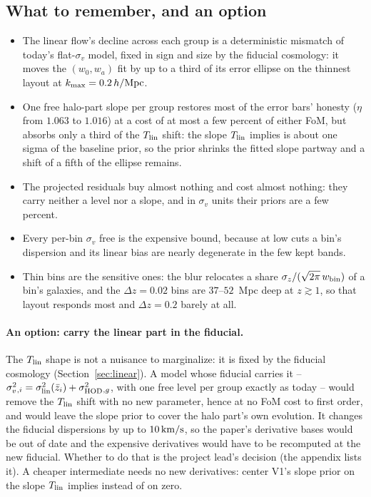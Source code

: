 \documentclass[11pt]{article}
\newcommand{\sv}{\sigma_v}
\newcommand{\slin}{\sigma_{\rm lin}}
\newcommand{\shod}{\sigma_{\rm HOD}}
\newcommand{\kms}{\,{\rm km/s}}
\newcommand{\hMpc}{\,h/{\rm Mpc}}
\newcommand{\kmax}{k_{\rm max}}
\begin{document}
\subsection{What to remember, and an option}
\label{sec:remember}

\begin{itemize}
  \item The linear flow's decline across each group is a
    deterministic mismatch of today's flat-$\sv$ model, fixed in
    sign and size by the fiducial cosmology: it moves the
    $(w_0, w_a)$ fit by up to a third of its error ellipse on the
    thinnest layout at $\kmax = 0.2\hMpc$.
  \item One free halo-part slope per group restores most of the
    error bars' honesty ($\eta$ from $1.063$ to $1.016$) at a cost
    of at most a few percent of either FoM, but absorbs only a third
    of the $T_{\rm lin}$ shift: the slope $T_{\rm lin}$ implies is
    about one sigma of the baseline prior, so the prior shrinks the
    fitted slope partway and a shift of a fifth of the ellipse
    remains.
  \item The projected residuals buy almost nothing and cost almost
    nothing: they carry neither a level nor a slope, and in $\sv$
    units their priors are a few percent.
  \item Every per-bin $\sv$ free is the expensive bound, because at
    low cuts a bin's dispersion and its linear bias are nearly
    degenerate in the few kept bands.
  \item Thin bins are the sensitive ones: the blur relocates a share
    $\sigma_z/(\sqrt{2\pi}\,w_{\rm bin})$ of a bin's galaxies, and
    the $\Delta z = 0.02$ bins are $37$--$52$~Mpc deep at
    $z \gtrsim 1$, so that layout responds most and
    $\Delta z = 0.2$ barely at all.
\end{itemize}

\paragraph{An option: carry the linear part in the fiducial.}
The $T_{\rm lin}$ shape is not a nuisance to marginalize: it is
fixed by the fiducial cosmology (Section~\ref{sec:linear}).  A model
whose fiducial carries it --
$\sv^2{}_{,i} = \slin^2(\bar{z}_i) + \shod^2{}_{,g}$, with one free
level per group exactly as today -- would remove the $T_{\rm lin}$
shift with no new parameter, hence at no FoM cost to first order,
and would leave the slope prior to cover the halo part's own
evolution.  It changes the fiducial dispersions by up to $10\kms$,
so the paper's derivative bases would be out of date and the
expensive derivatives would have to be recomputed at the new
fiducial.  Whether to do that is the project lead's decision (the
appendix lists it).  A cheaper intermediate needs no new
derivatives: center V1's slope prior on the slope $T_{\rm lin}$
implies instead of on zero.
\end{document}
